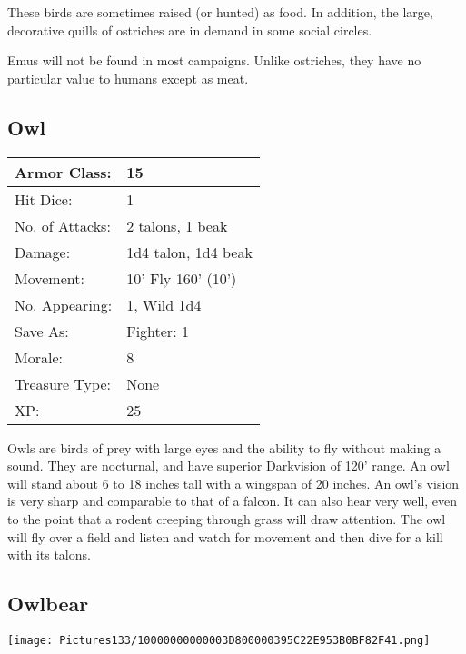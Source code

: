 \documentclass[a4paper,twoside,openany,10pt]{book}
\begin{document}
\begin{multicols}{2}
These birds are sometimes raised (or hunted) as food. In addition, the large, decorative quills of ostriches are in demand in some social
circles.

Emus will not be found in most campaigns. Unlike ostriches, they have no particular value to humans except as meat.

\subsection*{Owl}\label{owl}

\begin{tabularx}{0.50\textwidth}{@{}lX@{}}
Armor Class: & 15 \\\hline
Hit Dice: & 1 \\\hline
No. of Attacks: & 2 talons, 1 beak \\\hline
Damage: & 1d4 talon, 1d4 beak \\\hline
Movement: & 10' Fly 160' (10') \\\hline
No. Appearing: & 1, Wild 1d4 \\\hline
Save As: & Fighter: 1 \\\hline
Morale: & 8 \\\hline
Treasure Type: & None \\\hline
XP: & 25 \\\hline
\end{tabularx}\medskip

Owls are birds of prey with large eyes and the ability to fly without making a sound. They are nocturnal, and have superior Darkvision of 120' range. An owl will stand about 6 to 18 inches tall with a wingspan of 20 inches. An owl's vision is very sharp and comparable to that of a falcon. It can also hear very well, even to the point that a rodent creeping through grass will draw attention. The owl will fly over a field and listen and watch for movement and then dive for a kill with its talons.

\subsection*{Owlbear}\label{owlbear}


\begin{center} \texttt{[image: Pictures133/10000000000003D800000395C22E953B0BF82F41.png]} \end{center}


\end{multicols}
\end{document}
